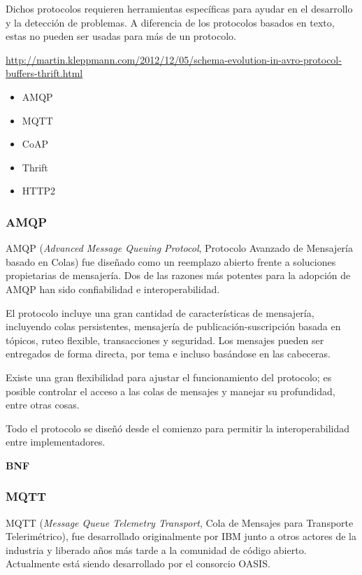 Dichos protocolos requieren herramientas específicas para ayudar en el desarrollo y la detección de problemas. A diferencia de los protocolos basados en texto, estas no pueden ser usadas para más de un protocolo.

\url{http://martin.kleppmann.com/2012/12/05/schema-evolution-in-avro-protocol-buffers-thrift.html}

\begin{itemize}
  \item AMQP
  \item MQTT
  \item CoAP
  \item Thrift
  \item HTTP2
\end{itemize}

\subsubsection{AMQP}
AMQP (\textit{Advanced Message Queuing Protocol}, Protocolo Avanzado de Mensajería basado en Colas) fue diseñado como un reemplazo abierto frente a soluciones propietarias de mensajería. Dos de las razones más potentes para la adopción de AMQP han sido confiabilidad e interoperabilidad.

El protocolo incluye una gran cantidad de características de mensajería, incluyendo colas persistentes, mensajería de publicación-suscripción basada en tópicos, ruteo flexible, transacciones y seguridad. Los mensajes pueden ser entregados de forma directa, por tema e incluso basándose en las cabeceras.

Existe una gran flexibilidad para ajustar el funcionamiento del protocolo; es posible controlar el acceso a las colas de mensajes y manejar su profundidad, entre otras cosas.

Todo el protocolo se diseñó desde el comienzo para permitir la interoperabilidad entre implementadores.

\textbf{BNF}



\subsubsection{MQTT}
MQTT (\textit{Message Queue Telemetry Transport}, Cola de Mensajes para Transporte Telerimétrico), fue desarrollado originalmente por IBM junto a otros actores de la industria y liberado años más tarde a la comunidad de código abierto. Actualmente está siendo desarrollado por el consorcio OASIS.

